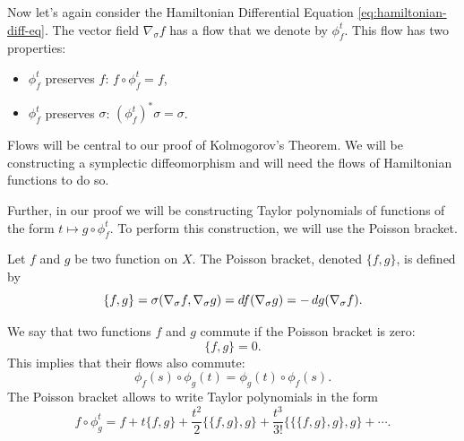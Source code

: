 \documentclass[twoside,letterpaper,10pt]{article}
\newcommand{\sgrad}{\nabla_{\sigma}}
\numberwithin{equation}{section}
\begin{document}
Now let's again consider the Hamiltonian Differential Equation
\cref{eq:hamiltonian-diff-eq}.
The vector field $\sgrad f$ has a flow that we denote by $\phi_f^t$.
This flow has two properties:
\begin{itemize}
\item $\phi_f^t$ preserves $f$: $f \circ \phi_f^t = f$,
\item $\phi_f^t$ preserves $\sigma$: $(\phi_f^t)^* \sigma = \sigma$.
\end{itemize}
Flows will be central to our proof of Kolmogorov's Theorem.
We will be constructing a symplectic diffeomorphism and will need the flows of
Hamiltonian functions to do so.

Further, in our proof we will be constructing Taylor polynomials of functions of
the form $t \mapsto g \circ \phi_f^t$.
To perform this construction, we will use the Poisson bracket.
\begin{defn}
  Let $f$ and $g$ be two function on $X$.
  The Poisson bracket, denoted $\{f, g\}$, is defined by
  \begin{equation*}
    \{f, g\} = \sigma(\sgrad f, \sgrad g) = \dif f(\sgrad g) = - \dif g(\sgrad
 f).
  \end{equation*}
\end{defn}
We say that two functions $f$ and $g$ commute if the Poisson bracket is zero:
\begin{equation*}
  \{f, g\} = 0.
\end{equation*}
This implies that their flows also commute:
\begin{equation*}
  \phi_f(s) \circ \phi_g(t) = \phi_g(t) \circ \phi_f(s).
\end{equation*}
The Poisson bracket allows to write Taylor polynomials in the form
\begin{equation*}
  f \circ \phi_g^t = f + t\{f, g\} + \frac{t^2}{2} \{\{f, g\}, g\} +
  \frac{t^3}{3!} \{ \{ \{f, g\}, g\}, g\} + \cdots.
\end{equation*}
\end{document}
